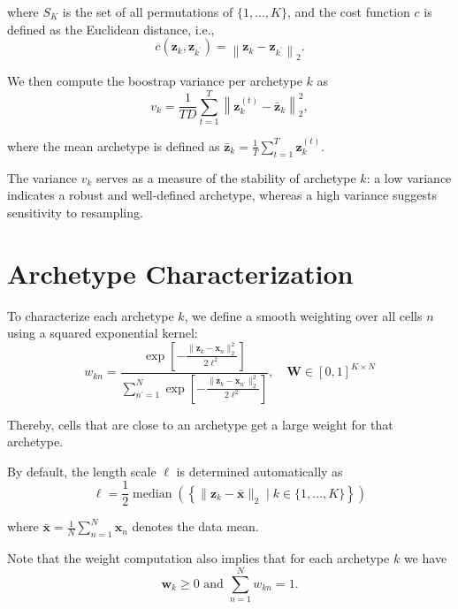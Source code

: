 \documentclass[oneside]{article}
\begin{document}
where $S_K$ is the set of all permutations of $\{1, ..., K\}$, and the cost function $c$ is defined as the Euclidean distance, i.e.,
\begin{equation}
    c(\mathbf{z}_k, \mathbf{z}_{k^\prime}) = \left\| \mathbf{z}_k - \mathbf{z}_{k^\prime} \right\|_2.
\end{equation}

We then compute the boostrap variance per archetype $k$ as
\begin{equation}
    v_k = \frac{1}{T D} \sum_{t=1}^T \left\| \mathbf{z}_k^{(t)} - \bar{\mathbf{z}}_k \right\|_2^2,
\end{equation}

where the mean archetype is defined as $\bar{\mathbf{z}}_k = \frac{1}{T} \sum_{t=1}^T \mathbf{z}_k^{(t)}$.

The variance $v_k$ serves as a measure of the stability of archetype $k$: a low variance indicates a robust and well-defined archetype, whereas a high variance suggests sensitivity to resampling.

\section{Archetype Characterization}
\label{sec:archetype_character}

To characterize each archetype $k$, we define a smooth weighting over all cells $n$ using a squared exponential kernel:
\begin{equation}
    w_{kn} = \frac{
        \exp \left[ - \frac{\| \mathbf{z}_k - \mathbf{x}_n \|_2^2 }{ 2 \ell^2} \right]
        }{
        \sum_{n^\prime=1}^N \exp \left[ - \frac{\| \mathbf{z}_k - \mathbf{x}_{n^\prime} \|_2^2 }{ 2 \ell^2} \right]
        }, \quad \mathbf{W} \in [0, 1]^{K \times N}
\end{equation}

Thereby, cells that are close to an archetype get a large weight for that archetype.

By default, the length scale $\ell$ is determined automatically as
\begin{equation}
    \ell = \frac{1}{2} \operatorname{median} \left( \left\{\| \mathbf{z}_k - \bar{\mathbf{x}} \|_2 \mid k \in \{1, ..., K\} \right\} \right)
\end{equation}

where $\bar{\mathbf{x}} = \frac{1}{N} \sum_{n=1}^N \mathbf{x}_n$ denotes the data mean.

Note that the weight computation also implies that for each archetype $k$ we have
\begin{equation}
    \mathbf{w}_{k} \geq 0 \text{ and } \sum_{n=1}^N w_{kn} = 1.
\end{equation}
\end{document}
